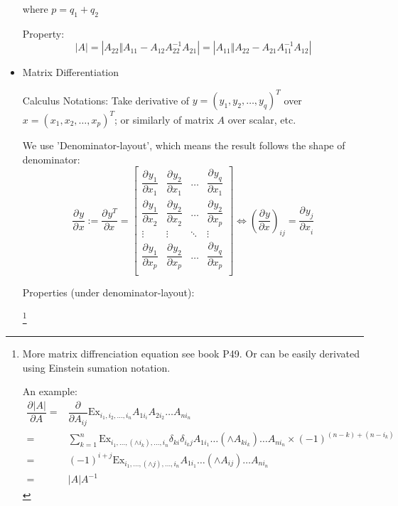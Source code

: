 \begin{itemize}[topsep=6pt,itemsep=4pt]
        where $ p=q_1+q_2 $      
        

        Property:
        \begin{equation}
            |A|= |A_{22}\Vert A_{11}-A_{12}A_{22}^{-1}A_{21}|=|A_{11}\Vert A_{22}-A_{21}A_{11}^{-1}A_{12}|
        \end{equation}
        
        

            
                       
        \item Matrix Differentiation
        
        Calculus Notations: Take derivative of $ y=(y_1,y_2,\ldots,y_q)^T $ over $ x=(x_1,x_2,\ldots,x_p)^T $; or similarly of matrix $ A $ over scalar, etc.
        
        We use 'Denominator-layout', which means the result follows the shape of denominator:
        \begin{equation}\label{EqaMatrixDifferential}
            \dfrac{\partial^{}y }{\partial ^{}x}:=\dfrac{\partial^{} y^T}{\partial x^{}} =
            \begin{bmatrix}
            \dfrac{\partial^{} y_1}{\partial x_1 ^{}}&\dfrac{\partial^{} y_2}{\partial x_1 ^{}}&\ldots&\dfrac{\partial^{} y_q}{\partial x_1 ^{}}\\
            \dfrac{\partial^{} y_1}{\partial x_2 ^{}}&\dfrac{\partial^{} y_2}{\partial x_2 ^{}}&\ldots&\dfrac{\partial^{} y_2}{\partial x_p ^{}}\\
            \vdots&\vdots&\ddots&\vdots\\
            \dfrac{\partial^{} y_1}{\partial x_p ^{}}&\dfrac{\partial^{} y_2}{\partial x_p ^{}}&\ldots&\dfrac{\partial^{} y_q}{\partial x_p ^{}}\\
            \end{bmatrix}\Leftrightarrow \left(\dfrac{\partial^{} y}{\partial x^{}}\right)_{ij}=\dfrac{\partial^{} y_j}{\partial x_i^{}}
        \end{equation}
        
        \hypertarget{MatrixDifferenciation}{Properties (under denominator-layout):}\footnote{More matrix diffrenciation equation see book \cite{线性回归分析ref2} P49. Or can be easily derivated using Einstein sumation notation.
        
        An example:
        \begin{align*}
            \dfrac{\partial^{} |A|}{\partial A^{}}=&\dfrac{\partial^{} }{\partial A_{ij}^{}}\mathrm{Ex}_{i_1,i_2,\ldots,i_n}A_{1i_i}A_{2i_2}\ldots A_{ni_n}\\
            =&\sum_{k=1}^n\mathrm{Ex}_{i_1,\ldots, (\wedge i_k),\ldots, i_n}\delta _{ki}\delta _{i_kj}A_{1i_1}\ldots (\wedge A_{ki_k})\ldots A_{ni_n}\times (-1)^{(n-k)+(n-i_k)}\\
            =& (-1)^{i+j}\mathrm{Ex}_{i_1,\ldots, (\wedge j),\ldots, i_n}A_{1i_1}\ldots (\wedge A_{ij})\ldots A_{ni_n} \\
            =&|A|A^{-1}
        \end{align*}
        
}
\end{itemize}
